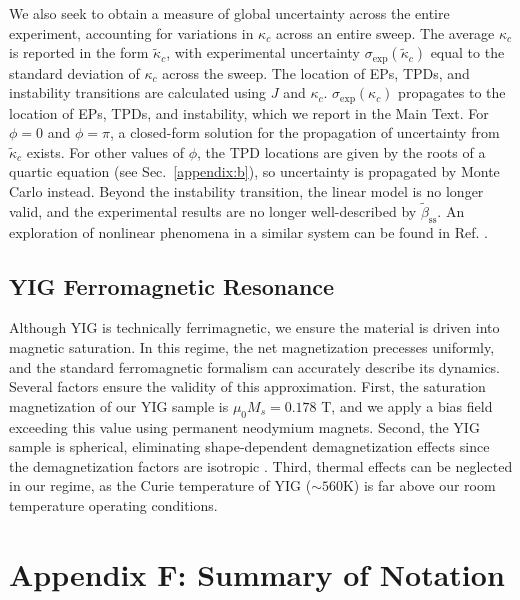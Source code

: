 \documentclass[%
  reprint,
  amsmath,amssymb,
  aps,
  prapplied,
  superscriptaddress,
  longbibliography]{revtex4-2}
\begin{document}
We also seek to obtain a measure of global uncertainty across the entire experiment, accounting for variations in $\kappa_c$ across an entire sweep. The average $\kappa_c$ is reported in the form $\tilde{\kappa}_c$, with experimental uncertainty $\sigma_\text{exp}(\tilde{\kappa}_c)$ equal to the standard deviation of $\kappa_c$ across the sweep. The location of EPs, TPDs, and instability transitions are calculated using $J$ and $\kappa_c$. $\sigma_\text{exp}(\kappa_c)$ propagates to the location of EPs, TPDs, and instability, which we report in the Main Text. For $\phi = 0$ and $\phi = \pi$, a closed-form solution for the propagation of uncertainty from $\tilde{\kappa}_c$ exists. For other values of $\phi$, the TPD locations are given by the roots of a quartic equation (see Sec.~\ref{appendix:b}), so uncertainty is propagated by Monte Carlo instead. Beyond the instability transition, the linear model is no longer valid, and the experimental results are no longer well-described by $\tilde{\beta}_{\mathrm{ss}}$. An exploration of nonlinear phenomena in a similar system can be found in Ref. \cite{salcedo-gallo_demonstration_2025}.

\subsection{\label{appendix-sec:yig_ferro}YIG Ferromagnetic Resonance}

Although YIG is technically ferrimagnetic, we ensure the material is driven into magnetic saturation. In this regime, the net magnetization precesses uniformly, and the standard ferromagnetic formalism can accurately describe its dynamics. Several factors ensure the validity of this approximation. First, the saturation magnetization of our YIG sample is $\mu_0M_s = 0.178$ T, and we apply a bias field exceeding this value using permanent neodymium magnets. Second, the YIG sample is spherical, eliminating shape-dependent demagnetization effects since the demagnetization factors are isotropic \cite{osborn_demagnetizing_1945}. Third, thermal effects can be neglected in our regime, as the Curie temperature of YIG ($\sim560$K) \cite{zhang_cavity_2015} is far above our room temperature operating conditions.

\section{\label{appendix:notation}Appendix F: Summary of Notation}
\end{document}
